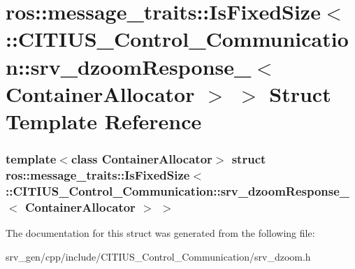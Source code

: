 \hypertarget{structros_1_1message__traits_1_1_is_fixed_size_3_01_1_1_c_i_t_i_u_s___control___communication_1_9e4d905b310f976d8c9c7d4dcdac17de}{\section{ros\-:\-:message\-\_\-traits\-:\-:\-Is\-Fixed\-Size$<$ \-:\-:\-C\-I\-T\-I\-U\-S\-\_\-\-Control\-\_\-\-Communication\-:\-:srv\-\_\-dzoom\-Response\-\_\-$<$ \-Container\-Allocator $>$ $>$ \-Struct \-Template \-Reference}
\label{structros_1_1message__traits_1_1_is_fixed_size_3_01_1_1_c_i_t_i_u_s___control___communication_1_9e4d905b310f976d8c9c7d4dcdac17de}
}
\subsubsection*{template$<$class Container\-Allocator$>$ struct ros\-::message\-\_\-traits\-::\-Is\-Fixed\-Size$<$ \-::\-C\-I\-T\-I\-U\-S\-\_\-\-Control\-\_\-\-Communication\-::srv\-\_\-dzoom\-Response\-\_\-$<$ Container\-Allocator $>$ $>$}



\-The documentation for this struct was generated from the following file\-:\begin{DoxyCompactItemize}
\item 
srv\-\_\-gen/cpp/include/\-C\-I\-T\-I\-U\-S\-\_\-\-Control\-\_\-\-Communication/srv\-\_\-dzoom.\-h\end{DoxyCompactItemize}
